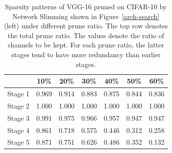 \setlength{\tabcolsep}{5pt}
\renewcommand{\arraystretch}{1.2}
\begin{table}[!htbp]
\centering
\small
\begin{tabular}{c|cccccc}
\hline
      & 10\%   & 20\%   & 30\%   & 40\%   & 50\%   & 60\%   \\ \hline
Stage 1 & 0.969 & 0.914 & 0.883 & 0.875 & 0.844 &
0.836 \\
Stage 2 & 1.000 & 1.000 & 1.000 & 1.000 & 1.000 &
1.000 \\
Stage 3 & 0.991 & 0.975 & 0.966 & 0.957 & 0.947 & 0.947 \\
Stage 4 & 0.861 & 0.718 & 0.575 & 0.446 & 0.312 & 0.258 \\
Stage 5 & 0.871 & 0.751 & 0.626 & 0.486 & 0.352 & 0.132 \\ \hline
\end{tabular}
    \vspace{1ex}
    \caption{
      Sparsity patterns of VGG-16 pruned on CIFAR-10 by Network Slimming shown in Figure~\ref{arch-search} (left) under different prune ratio. The top row denotes the total prune ratio. The values denote the ratio of channels to be kept. For each prune ratio, the latter stages tend to have more redundancy than earlier stages.}
     \label{sparsity-2}
     \vspace{-2ex}
\end{table}